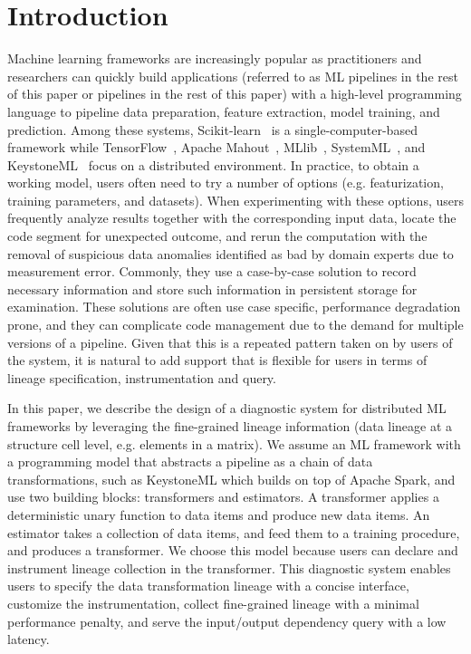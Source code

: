 \documentclass{sig-alternate}
\begin{document}
\section{Introduction}
Machine learning frameworks are increasingly popular as practitioners and researchers can quickly
build applications (referred to as ML pipelines in the rest of this paper or pipelines in the rest of this paper) with a high-level 
programming language to pipeline data preparation, feature extraction, model training, and prediction. 
Among these systems, Scikit-learn~\cite{pedregosa2011scikit}
is a single-computer-based framework while TensorFlow~\cite{tensorflow15}, Apache Mahout~\cite{owen2011mahout}, MLlib~\cite{meng2015mllib}, 
SystemML~\cite{ghoting11systemml}, and KeystoneML~\cite{sparks15} focus on a distributed environment.
In practice, to obtain a working model, users often need to try a number of options (e.g. featurization, training parameters, and datasets). 
When experimenting with these options, users frequently analyze results together with the corresponding input data,  
locate the code segment for unexpected outcome, and rerun the computation with the removal of suspicious data anomalies
identified as bad by domain experts due to measurement error.
Commonly, they use a case-by-case solution to record necessary information and store such information in persistent storage for examination.
These solutions are often use case specific, performance degradation prone, and they can complicate code
management due to the demand for multiple versions of a pipeline.
Given that this is a repeated pattern taken on by users of the system, it is natural to add support 
that is flexible for users in terms of lineage specification, instrumentation and query.

In this paper, we describe the design of a diagnostic system for distributed ML frameworks by leveraging the fine-grained lineage information
(data lineage at a structure cell level, e.g. elements in a matrix). 
We assume an ML framework with a programming model that abstracts a pipeline as a chain of data transformations, such as KeystoneML
which builds on top of Apache Spark, and use two building blocks: transformers and estimators.
A transformer applies a deterministic unary function to data items and produce new data items.
An estimator takes a collection of data items, and feed them to a training procedure,  and produces a transformer.
We choose this model because users can declare and instrument lineage collection in the transformer.
This diagnostic system enables users to specify the data transformation lineage with a concise interface, customize the instrumentation, 
collect fine-grained lineage with a minimal performance penalty, and serve the input/output dependency query with a low latency. 
\end{document}
